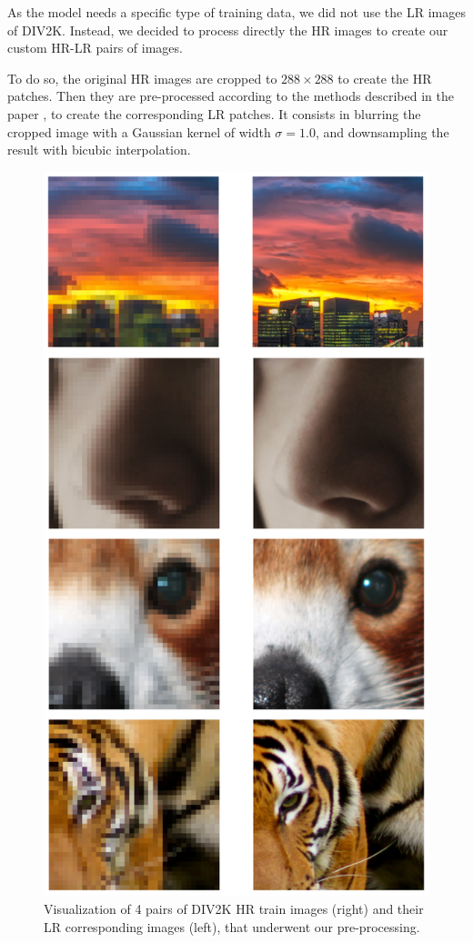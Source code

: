 \documentclass{article}
\begin{document}
{{        \bigskip

        As the model needs a specific type of training data, we did not use the LR images of DIV2K. Instead, we decided to process directly the HR images to create our custom HR-LR pairs of images.

        To do so, the original HR images are cropped to $288 \times 288$ to create the HR patches. Then they are pre-processed according to the methods described in the paper \citep{sr}, to create the corresponding LR patches. It consists in blurring the cropped image with a Gaussian kernel of width $\sigma = 1.0$, and downsampling the result with bicubic interpolation.

        \begin{figure}[p]
            \centering
            \includegraphics[height=0.9\textheight]{images/DIV2K_HRLR.png}
            \caption{Visualization of 4 pairs of DIV2K HR train images (right) and their LR corresponding images (left), that underwent our pre-processing.}
            \label{fig:div2k-train-pair}
        \end{figure}

}}
\end{document}
